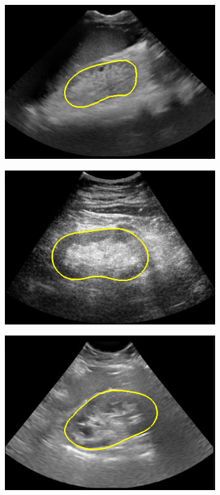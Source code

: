 \begin{figure}
\centering
\begin{subfigure}{.33\textwidth}
  \centering
  \includegraphics[width=.95\textwidth]{img_transfer/adult_bad}
\end{subfigure}%
\begin{subfigure}{.33\textwidth}
  \centering
  \includegraphics[width=.95\textwidth]{img_transfer/adult_less_bad}
\end{subfigure}
\begin{subfigure}{.33\textwidth}
  \centering
  \includegraphics[width=.95\textwidth]{img_transfer/child_less_bad}

\end{subfigure}
\end{figure}
